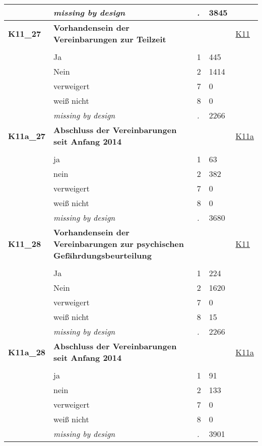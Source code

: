 \begin{longtable}{| L{2.65cm} | L{8cm} | C{1.5cm} | R{1.25cm} | C{2.25cm}  |}
   & \textit{missing by design} & \textit{.} & 3845 &  \\ 
   \midrule
\textbf{K11\_27}\label{var:K11:27} & \textbf{Vorhandensein der Vereinbarungen zur Teilzeit} &  &  & \hyperref[K11]{K11} \\ 
   &  &  &  &  \\ 
   & Ja & 1 & 445 &  \\ 
   & Nein & 2 & 1414 &  \\ 
   & verweigert & 7 & 0 &  \\ 
   & weiß nicht & 8 & 0 &  \\ 
   & \textit{missing by design} & \textit{.} & 2266 &  \\ 
   \midrule
\textbf{K11a\_27}\label{var:K11a:27} & \textbf{Abschluss der Vereinbarungen seit Anfang 2014} &  &  & \hyperref[K11a]{K11a} \\ 
   &  &  &  &  \\ 
   & ja & 1 & 63 &  \\ 
   & nein & 2 & 382 &  \\ 
   & verweigert & 7 & 0 &  \\ 
   & weiß nicht & 8 & 0 &  \\ 
   & \textit{missing by design} & \textit{.} & 3680 &  \\ 
   \midrule
\textbf{K11\_28}\label{var:K11:28} & \textbf{Vorhandensein der Vereinbarungen zur psychischen Gefährdungsbeurteilung} &  &  & \hyperref[K11]{K11} \\ 
   &  &  &  &  \\ 
   & Ja & 1 & 224 &  \\ 
   & Nein & 2 & 1620 &  \\ 
   & verweigert & 7 & 0 &  \\ 
   & weiß nicht & 8 & 15 &  \\ 
   & \textit{missing by design} & \textit{.} & 2266 &  \\ 
   \midrule
\textbf{K11a\_28}\label{var:K11a:28} & \textbf{Abschluss der Vereinbarungen seit Anfang 2014} &  &  & \hyperref[K11a]{K11a} \\ 
   &  &  &  &  \\ 
   & ja & 1 & 91 &  \\ 
   & nein & 2 & 133 &  \\ 
   & verweigert & 7 & 0 &  \\ 
   & weiß nicht & 8 & 0 &  \\ 
   & \textit{missing by design} & \textit{.} & 3901 &  \\ 

\end{longtable}
